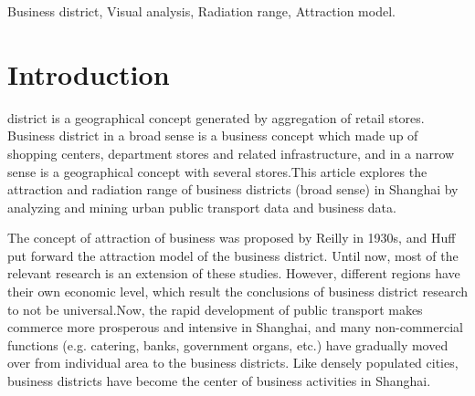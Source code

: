 \documentclass[journal]{IEEEtran}
\begin{document}
\begin{IEEEkeywords}
Business district, Visual analysis, Radiation range, Attraction model.
\end{IEEEkeywords}

%
\IEEEpeerreviewmaketitle

\section{Introduction}
% 
% 
% 
% 
 district is a geographical concept generated by aggregation of retail stores. Business district in a broad sense is a business concept which made up of shopping centers, department stores and related infrastructure, and in a narrow sense is a geographical concept with several stores.This article explores the attraction and radiation range of business districts (broad sense) in Shanghai by analyzing and mining urban public transport data and business data.

The concept of attraction of business was proposed by Reilly in 1930s, and Huff put forward the attraction model of the business district. Until now, most of the relevant research is an extension of these studies. However, different regions have their own economic level, which result the conclusions of business district research to not be universal.Now, the rapid development of public transport makes commerce more prosperous and intensive in Shanghai, and many non-commercial functions (e.g. catering, banks, government organs, etc.) have gradually moved over from individual area to the business districts. Like densely populated cities, business districts have become the center of business activities in Shanghai.
\end{document}
